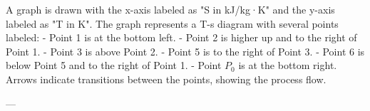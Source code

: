 A graph is drawn with the x-axis labeled as "S in kJ/kg·K" and the y-axis labeled as "T in K". The graph represents a T-s diagram with several points labeled:  
- Point 1 is at the bottom left.  
- Point 2 is higher up and to the right of Point 1.  
- Point 3 is above Point 2.  
- Point 5 is to the right of Point 3.  
- Point 6 is below Point 5 and to the right of Point 1.  
- Point \( P_0 \) is at the bottom right.  
Arrows indicate transitions between the points, showing the process flow.

---